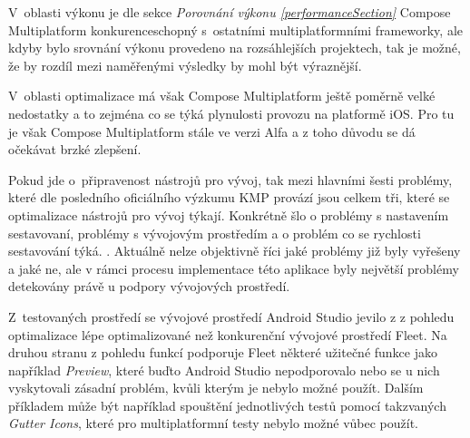 V~oblasti výkonu je dle sekce \textit{Porovnání výkonu \ref{performanceSection}} Compose Multiplatform konkurenceschopný s~ostatními 
multiplatformními frameworky, ale kdyby bylo srovnání výkonu provedeno na rozsáhlejších projektech, tak je možné, že by rozdíl mezi 
naměřenými výsledky by mohl být výraznější.

\bigskip

V~oblasti optimalizace má však Compose Multiplatform ještě poměrně velké nedostatky a to zejména co se týká plynulosti provozu na platformě iOS.
Pro tu je však Compose Multiplatform stále ve verzi Alfa a z toho důvodu se dá očekávat brzké zlepšení.

Pokud jde o~připravenost nástrojů pro vývoj, tak mezi hlavními šesti problémy, které dle posledního oficiálního výzkumu KMP
provází jsou celkem tři, které se optimalizace nástrojů pro vývoj týkají. Konkrétně šlo o problémy s nastavením sestavovaní, problémy s 
vývojovým prostředím a o problém co se rychlosti sestavování týká. \cite{imgSurvey}. Aktuálně nelze objektivně říci jaké problémy již byly 
vyřešeny a jaké ne, ale v rámci procesu implementace této aplikace byly největší problémy detekovány právě u podpory vývojových prostředí.

Z~testovaných prostředí se vývojové prostředí Android Studio jevilo z z pohledu optimalizace lépe optimalizované než konkurenční vývojové 
prostředí Fleet. Na druhou stranu z pohledu funkcí podporuje Fleet některé užitečné funkce jako například \textit{Preview}, které buďto
Android Studio nepodporovalo nebo se u nich vyskytovali zásadní problém, kvůli kterým je nebylo možné použít. Dalším příkladem může být 
například spouštění jednotlivých testů pomocí takzvaných \textit{Gutter Icons}, které pro multiplatformní testy nebylo možné vůbec použít. 





